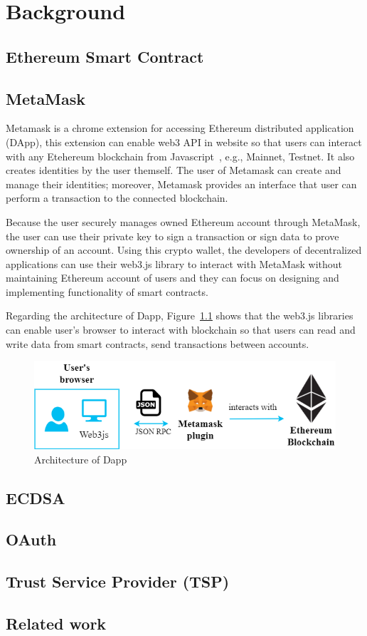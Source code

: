 \chapter{Background}
\label{chapter:background}

\section{Ethereum Smart Contract}

\newpage
\section{MetaMask}
Metamask is a chrome extension for accessing Ethereum distributed application (DApp), this extension can enable web3 API in website so that users can interact with any Etehereum blockchain from Javascript~\cite{web3.js}, e.g., Mainnet, Testnet. It also creates identities by the user themself. The user of Metamask can create and manage their identities; moreover, Metamask provides an interface that user can perform a transaction to the connected blockchain.\par
Because the user securely  manages owned Ethereum account through MetaMask, the user can use their private key to sign a transaction or sign data to prove ownership of an account. Using this crypto wallet, the developers of decentralized applications can use their web3.js library to interact with MetaMask without maintaining Ethereum account of users and they can focus on designing and implementing functionality of smart contracts.\par
Regarding the architecture of Dapp, Figure~\ref{fig:architecture_of_dapp} shows that the web3.js libraries can enable user's browser to interact with blockchain so that users can read and write data from smart contracts, send transactions between accounts. 

\begin{figure}[hb]
    \centering
    \includegraphics[height=!,width=1\linewidth,keepaspectratio=true]{figures/architecture_of_dapp.png}
    \caption{{\footnotesize Architecture of Dapp}}
    \label{fig:architecture_of_dapp}
\end{figure}

\section{ECDSA}
\newpage
\section{OAuth}

\section{Trust Service Provider (TSP)}

\section{Related work}
